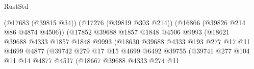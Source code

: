 \begin{lexlean}{RustStd}
\begin{coremodule}
                                                (@17683 (@39815 @34))
                                                (@17276 (@39819 @303 @214))
                                                (@16866 (@39826 @214 @86 @4874 @4506))
                                                (@17852
                                                  @39688
                                                  @1857
                                                  @1848
                                                  @4506
                                                  @9993
                                                  (@18621
                                                    @39688
                                                    @4333
                                                    @1857
                                                    @1848
                                                    @9993
                                                    (@18630
                                                      @39688
                                                      @4333
                                                      @193
                                                      @277
                                                      @17
                                                      @11
                                                      @4699
                                                      @4877
                                                      (@39742
                                                        @279
                                                        @17
                                                        @15
                                                        @4699
                                                        @6492
                                                        @39755
                                                        (@39741
                                                          @277
                                                          @104
                                                          @11
                                                          @14
                                                          @4877
                                                          @4517
                                                          (@18667
                                                            @39688
                                                            @4333
                                                            @274
                                                            @11

\end{coremodule}
\end{lexlean}
